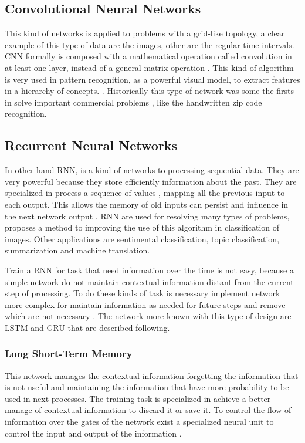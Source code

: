 \documentclass[12pt]{report}
\begin{document}
\subsection{Convolutional Neural Networks}
This kind of networks is applied to problems with a grid-like topology, a clear example of this type of data are the images, other are the regular time intervals. \ac{CNN} formally is composed with a mathematical operation called convolution in at least one layer, instead of a general matrix operation \cite{Goodfellow2016}. This kind of algorithm is very used in pattern recognition, as a powerful visual model, to extract features in a hierarchy of concepts. \cite{Long2015}. Historically this type of network was some the firsts in solve important commercial problems \cite{Goodfellow2016}, like the handwritten zip code recognition.

\subsection{Recurrent Neural Networks}
In other hand \ac{RNN}, is a kind of networks to processing sequential data. They are very powerful because they store efficiently information about the past. They are specialized in process a sequence of values \cite{Goodfellow2016}, mapping all the previous input to each output. This allows the memory of old inputs can persist and influence in the next network output \cite{Graves2017}. \ac{RNN} are used for resolving many types of problems, \cite{Chandra2017} proposes a method to improving the use of this algorithm in classification of images. Other applications are sentimental classification, topic classification, summarization and machine translation.

Train a \ac{RNN} for task that need information over the time is not easy, because a simple network do not maintain contextual information distant from the current step of processing. To do these kinds of task is necessary implement network more complex for maintain information as needed for future steps and remove which are not necessary \cite{Jurafsky2018}. The network more known with this type of design are \ac{LSTM} and \ac{GRU} that are described following.


\subsubsection{Long Short-Term Memory}
This network manages the contextual information forgetting the information that is not useful and maintaining the information that have more probability to be used in next processes. The training task is specialized in achieve a better manage of contextual information to discard it or save it. To control the flow of information over the gates of the network exist a specialized neural unit to control the input and output of the information \cite{Jurafsky2018}.
\end{document}
